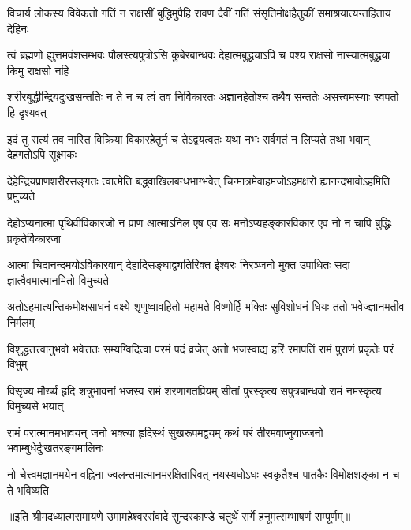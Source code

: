 


\addtocounter{shlokacount}{14}

\fourlineindentedshloka
{विचार्य लोकस्य विवेकतो गतिं}
{न राक्षसीं बुद्धिमुपैहि रावण}
{दैवीं गतिं संसृतिमोक्षहैतुकीं}
{समाश्रयात्यन्तहिताय देहिनः} %

\fourlineindentedshloka
{त्वं ब्रह्मणो ह्युत्तमवंशसम्भवः}
{पौलस्त्यपुत्रोऽसि कुबेरबान्धवः}
{देहात्मबुद्ध्याऽपि च पश्य राक्षसो}
{नास्यात्मबुद्ध्या किमु राक्षसो नहि} %

\fourlineindentedshloka
{शरीरबुद्धीन्द्रियदुःखसन्ततिः}
{न ते न च त्वं तव निर्विकारतः}
{अज्ञानहेतोश्च तथैव सन्ततेः}
{असत्त्वमस्याः स्वपतो हि दृश्यवत्} %

\fourlineindentedshloka
{इदं तु सत्यं तव नास्ति विक्रिया}
{विकारहेतुर्न च तेऽद्वयत्वतः}
{यथा नभः सर्वगतं न लिप्यते}
{तथा भवान् देहगतोऽपि सूक्ष्मकः}

\fourlineindentedshloka
{देहेन्द्रियप्राणशरीरसङ्गतः}
{त्वात्मेति बद्\mbox{}ध्वाखिलबन्धभाग्भवेत्} %
{चिन्मात्रमेवाहमजोऽहमक्षरो}
{ह्यानन्दभावोऽहमिति प्रमुच्यते}

\fourlineindentedshloka
{देहोऽप्यनात्मा पृथिवीविकारजो}
{न प्राण आत्माऽनिल एष एव सः} %
{मनोऽप्यहङ्कारविकार एव नो}
{न चापि बुद्धिः प्रकृतेर्विकारजा}

\fourlineindentedshloka
{आत्मा चिदानन्दमयोऽविकारवान्}
{देहादिसङ्घाद्व्यतिरिक्त ईश्वरः} %
{निरञ्जनो मुक्त उपाधितः सदा}
{ज्ञात्वैवमात्मानमितो विमुच्यते}

\fourlineindentedshloka
{अतोऽहमात्यन्तिकमोक्षसाधनं}
{वक्ष्ये शृणुष्वावहितो महामते} %
{विष्णोर्हि भक्तिः सुविशोधनं धियः}
{ततो भवेज्ज्ञानमतीव निर्मलम्}

\fourlineindentedshloka
{विशुद्धतत्त्वानुभवो भवेत्ततः}
{सम्यग्विदित्वा परमं पदं व्रजेत्} %
{अतो भजस्वाद्य हरिं रमापतिं}
{रामं पुराणं प्रकृतेः परं विभुम्}

\fourlineindentedshloka
{विसृज्य मौर्ख्यं हृदि शत्रुभावनां}
{भजस्व रामं शरणागतप्रियम्}
{सीतां पुरस्कृत्य सपुत्रबान्धवो}
{रामं नमस्कृत्य विमुच्यसे भयात्} %

\fourlineindentedshloka
{रामं परात्मानमभावयन् जनो}
{भक्त्या हृदिस्थं सुखरूपमद्वयम्}
{कथं परं तीरमवाप्नुयाज्जनो}
{भवाम्बुधेर्दुःखतरङ्गमालिनः} %

\fourlineindentedshloka
{नो चेत्त्वमज्ञानमयेन वह्निना}
{ज्वलन्तमात्मानमरक्षितारिवत्}
{नयस्यधोऽधः स्वकृतैश्च पातकैः}
{विमोक्षशङ्का न च ते भविष्यति} %

{॥इति श्रीमदध्यात्मरामायणे उमामहेश्वरसंवादे सुन्दरकाण्डे
चतुर्थे सर्गे हनूमत्सम्भाषणं सम्पूर्णम्॥}
